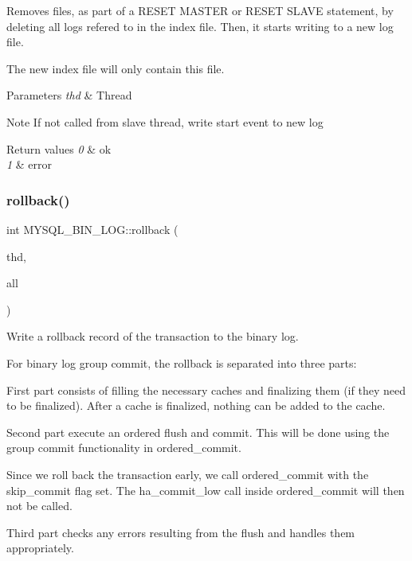 Removes files, as part of a R\+E\+S\+ET M\+A\+S\+T\+ER or R\+E\+S\+ET S\+L\+A\+VE statement, by deleting all logs refered to in the index file. Then, it starts writing to a new log file.

The new index file will only contain this file.


\begin{DoxyParams}{Parameters}
{\em thd} & Thread\\
\hline
\end{DoxyParams}
\begin{DoxyNote}{Note}
If not called from slave thread, write start event to new log
\end{DoxyNote}

\begin{DoxyRetVals}{Return values}
{\em 0} & ok \\
\hline
{\em 1} & error \\
\hline
\end{DoxyRetVals}
\mbox{\label{group__Binary__Log_ga9590d29210bd03fce1b8f9effc7c2d2a}} 
\subsubsection{\texorpdfstring{rollback()}{rollback()}}
{\footnotesize\ttfamily int M\+Y\+S\+Q\+L\+\_\+\+B\+I\+N\+\_\+\+L\+O\+G\+::rollback (\begin{DoxyParamCaption}\item[{T\+HD $\ast$}]{thd,  }\item[{bool}]{all }\end{DoxyParamCaption})\hspace{0.3cm}{\ttfamily [virtual]}}

Write a rollback record of the transaction to the binary log.

For binary log group commit, the rollback is separated into three parts\+:


\begin{DoxyEnumerate}
\item First part consists of filling the necessary caches and finalizing them (if they need to be finalized). After a cache is finalized, nothing can be added to the cache.
\item Second part execute an ordered flush and commit. This will be done using the group commit functionality in {\ttfamily ordered\+\_\+commit}.

Since we roll back the transaction early, we call {\ttfamily ordered\+\_\+commit} with the {\ttfamily skip\+\_\+commit} flag set. The {\ttfamily ha\+\_\+commit\+\_\+low} call inside {\ttfamily ordered\+\_\+commit} will then not be called.
\item Third part checks any errors resulting from the flush and handles them appropriately.
\end{DoxyEnumerate}

